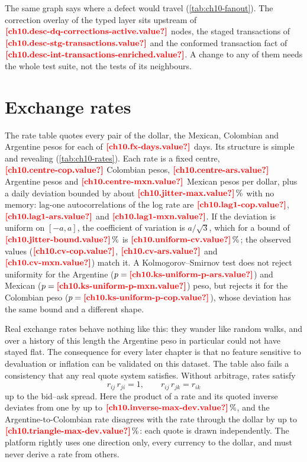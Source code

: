 The same graph says where a defect would travel (\cref{tab:ch10-fanout}). The correction overlay of the typed layer
sits upstream of $\est{ch10.desc-dq-corrections-active}{value}$ nodes, the staged transactions of
$\est{ch10.desc-stg-transactions}{value}$ and the conformed transaction fact of
$\est{ch10.desc-int-transactions-enriched}{value}$. A change to any of them needs the whole test suite, not the tests of
its neighbours.



\section{Exchange rates}\label{sec:cf-rates}

The rate table quotes every pair of the dollar, the Mexican, Colombian and Argentine pesos for each of
$\est{ch10.fx-days}{value}$ days. Its structure is simple and revealing (\cref{tab:ch10-rates}). Each rate is a fixed
centre, $\est{ch10.centre-cop}{value}$ Colombian pesos, $\est{ch10.centre-ars}{value}$ Argentine pesos and
$\est{ch10.centre-mxn}{value}$ Mexican pesos per dollar, plus a daily deviation bounded by about
$\est{ch10.jitter-max}{value}\,\%$ with no memory: lag-one autocorrelations of the log rate are
$\est{ch10.lag1-cop}{value}$, $\est{ch10.lag1-ars}{value}$ and $\est{ch10.lag1-mxn}{value}$. If the deviation is uniform
on $[-a, a]$, the coefficient of variation is $a / \sqrt{3}$, which for a bound of $\est{ch10.jitter-bound}{value}\,\%$ is
$\est{ch10.uniform-cv}{value}\,\%$; the observed values ($\est{ch10.cv-cop}{value}$, $\est{ch10.cv-ars}{value}$ and
$\est{ch10.cv-mxn}{value}$) match it. A Kolmogorov--Smirnov test does not reject uniformity for the Argentine
($p = \est{ch10.ks-uniform-p-ars}{value}$) and Mexican ($p = \est{ch10.ks-uniform-p-mxn}{value}$) peso, but rejects it for
the Colombian peso ($p = \est{ch10.ks-uniform-p-cop}{value}$), whose deviation has the same bound and a different shape.



Real exchange rates behave nothing like this: they wander like random walks, and over a history of this length the Argentine peso in
particular could not have stayed flat. The consequence for every later chapter is that no feature sensitive to
devaluation or inflation can be validated on this dataset. The table also fails a consistency that any real quote
system satisfies. Without arbitrage, rates satisfy
\begin{equation}\label{eq:cf-arbitrage}
  r_{ij}\, r_{ji} = 1, \qquad r_{ij}\, r_{jk} = r_{ik}
\end{equation}
up to the bid--ask spread. Here the product of a rate and its quoted inverse deviates from one by up to
$\est{ch10.inverse-max-dev}{value}\,\%$, and the Argentine-to-Colombian rate disagrees with the rate through the dollar by
up to $\est{ch10.triangle-max-dev}{value}\,\%$: each quote is drawn independently. The platform rightly uses one direction
only, every currency to the dollar, and must never derive a rate from others.

